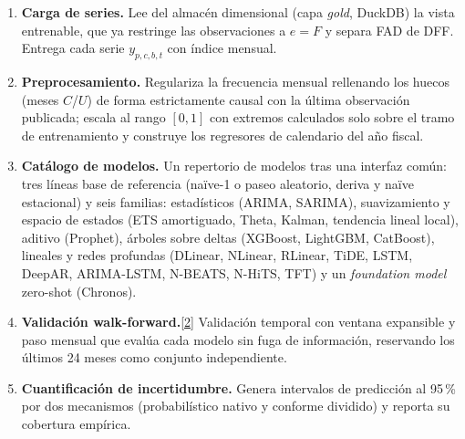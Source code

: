 \documentclass[12pt,letterpaper]{report}
\newcommand{\cita}[1]{\hyperref[bib:#1]{[#1]}}
\begin{document}
\begin{enumerate}[leftmargin=*]
\item \textbf{Carga de series.} Lee del almacén dimensional (capa \textit{gold},
DuckDB) la vista entrenable, que ya restringe las observaciones a $e=F$ y separa
FAD de DFF. Entrega cada serie $y_{p,c,b,t}$ con índice mensual.
\item \textbf{Preprocesamiento.} Regulariza la frecuencia mensual rellenando los
huecos (meses $C$/$U$) de forma estrictamente causal con la última observación
publicada; escala al rango $[0,1]$ con extremos calculados solo sobre el tramo de
entrenamiento y construye los regresores de calendario del año fiscal.
\item \textbf{Catálogo de modelos.} Un repertorio de \factNModels{} modelos tras una interfaz común: tres
líneas base de referencia (naïve-1 o paseo aleatorio, deriva y naïve estacional) y seis
familias: estadísticos (ARIMA, SARIMA), suavizamiento y espacio de estados (ETS
amortiguado, Theta, Kalman, tendencia lineal local), aditivo (Prophet), árboles sobre
deltas (XGBoost, LightGBM, CatBoost), lineales y redes profundas (DLinear, NLinear,
RLinear, TiDE, LSTM, DeepAR, ARIMA-LSTM, N-BEATS, N-HiTS, TFT) y un \textit{foundation
model} zero-shot (Chronos).
\item \textbf{Validación walk-forward.}\cita{2} Validación temporal con ventana
expansible y paso mensual que evalúa cada modelo sin fuga de información, reservando
los últimos 24 meses como conjunto independiente.
\item \textbf{Cuantificación de incertidumbre.} Genera intervalos de predicción al
95\,\% por dos mecanismos (probabilístico nativo y conforme dividido) y reporta su
cobertura empírica.
\end{enumerate}
\end{document}
